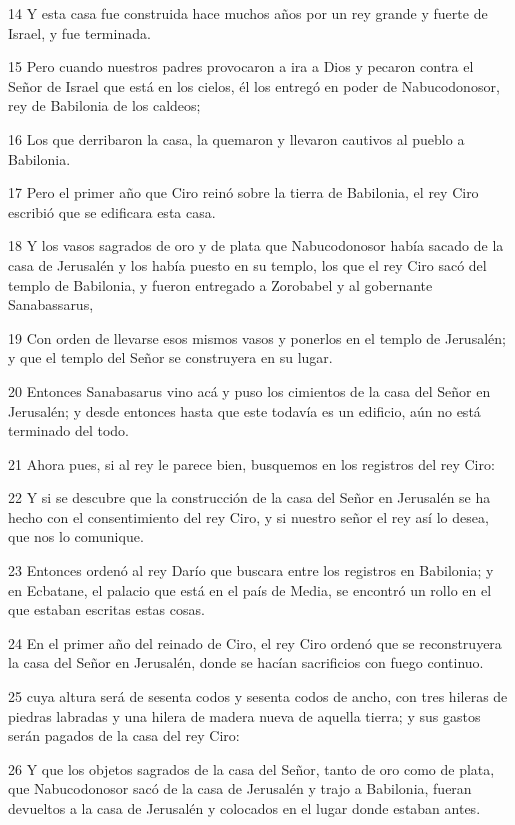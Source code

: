 \par 14 Y esta casa fue construida hace muchos años por un rey grande y fuerte de Israel, y fue terminada.
\par 15 Pero cuando nuestros padres provocaron a ira a Dios y pecaron contra el Señor de Israel que está en los cielos, él los entregó en poder de Nabucodonosor, rey de Babilonia de los caldeos;
\par 16 Los que derribaron la casa, la quemaron y llevaron cautivos al pueblo a Babilonia.
\par 17 Pero el primer año que Ciro reinó sobre la tierra de Babilonia, el rey Ciro escribió que se edificara esta casa.
\par 18 Y los vasos sagrados de oro y de plata que Nabucodonosor había sacado de la casa de Jerusalén y los había puesto en su templo, los que el rey Ciro sacó del templo de Babilonia, y fueron entregado a Zorobabel y al gobernante Sanabassarus,
\par 19 Con orden de llevarse esos mismos vasos y ponerlos en el templo de Jerusalén; y que el templo del Señor se construyera en su lugar.
\par 20 Entonces Sanabasarus vino acá y puso los cimientos de la casa del Señor en Jerusalén; y desde entonces hasta que este todavía es un edificio, aún no está terminado del todo.
\par 21 Ahora pues, si al rey le parece bien, busquemos en los registros del rey Ciro:
\par 22 Y si se descubre que la construcción de la casa del Señor en Jerusalén se ha hecho con el consentimiento del rey Ciro, y si nuestro señor el rey así lo desea, que nos lo comunique.
\par 23 Entonces ordenó al rey Darío que buscara entre los registros en Babilonia; y en Ecbatane, el palacio que está en el país de Media, se encontró un rollo en el que estaban escritas estas cosas.
\par 24 En el primer año del reinado de Ciro, el rey Ciro ordenó que se reconstruyera la casa del Señor en Jerusalén, donde se hacían sacrificios con fuego continuo.
\par 25 cuya altura será de sesenta codos y sesenta codos de ancho, con tres hileras de piedras labradas y una hilera de madera nueva de aquella tierra; y sus gastos serán pagados de la casa del rey Ciro:
\par 26 Y que los objetos sagrados de la casa del Señor, tanto de oro como de plata, que Nabucodonosor sacó de la casa de Jerusalén y trajo a Babilonia, fueran devueltos a la casa de Jerusalén y colocados en el lugar donde estaban antes.
